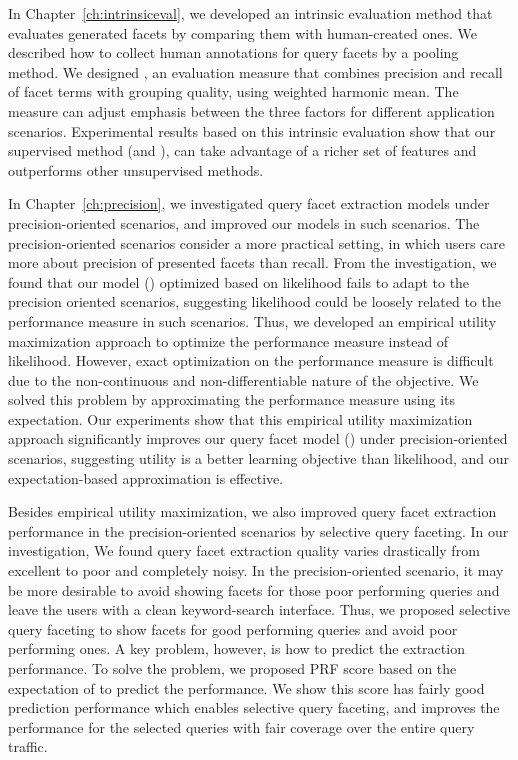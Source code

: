 In Chapter~\ref{ch:intrinsiceval}, we developed an intrinsic evaluation method that evaluates generated facets by comparing them with human-created ones. We described how to collect human annotations for query facets by a pooling method. We designed \PRF, an evaluation measure that combines precision and recall of facet terms with grouping quality, using weighted harmonic mean. The measure can adjust emphasis between the three factors for different application scenarios. Experimental results based on this intrinsic evaluation show that our supervised method (\QFI and \QFJ), can take advantage of a richer set of features and outperforms other unsupervised methods.

In Chapter~\ref{ch:precision}, we investigated query facet extraction models under precision-oriented scenarios, and improved our models in such scenarios. The precision-oriented scenarios consider a more practical setting, in which users care more about precision of presented facets than recall. From the investigation, we found that our model (\QFJ) optimized based on likelihood fails to adapt to the precision oriented scenarios, suggesting likelihood could be loosely related to the performance measure in such scenarios. Thus, we developed an empirical utility maximization approach to optimize the performance measure instead of likelihood. However, exact optimization on the performance measure is difficult due to the non-continuous and non-differentiable nature of the objective. We solved this problem by approximating the performance measure using its expectation. Our experiments show that this empirical utility maximization approach significantly improves our query facet model (\QFJ) under precision-oriented scenarios, suggesting utility is a better learning objective than likelihood, and our expectation-based approximation is effective. 
 
Besides empirical utility maximization, we also improved query facet extraction performance in the precision-oriented scenarios by selective query faceting. In our investigation, We found query facet extraction quality varies drastically from excellent to poor and completely noisy. In the precision-oriented scenario, it may be more desirable to avoid showing facets for those poor performing queries and leave the users with a clean keyword-search interface. Thus, we proposed selective query faceting to show facets for good performing queries and avoid poor performing ones. A key problem, however, is how to predict the extraction performance. To solve the problem, we proposed PRF score based on the expectation of \PRF to predict the performance. We show this score has fairly good prediction performance which enables selective query faceting, and improves the performance for the selected queries with fair coverage over the entire query traffic.

